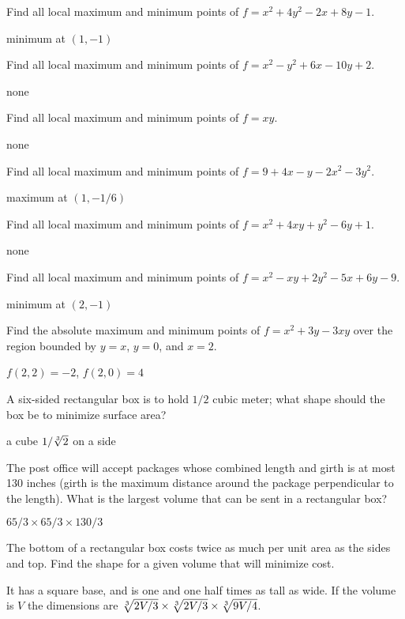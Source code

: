 \begin{exercises}

\exercise Find all local maximum and minimum points of
$f=x^2+4y^2-2x+8y-1$.
\begin{answer} minimum at $(1,-1)$
\end{answer}

\exercise Find all local maximum and minimum points of
$f=x^2-y^2+6x-10y+2$.
\begin{answer} none
\end{answer}

\exercise Find all local maximum and minimum points of
$f=xy$.
\begin{answer} none
\end{answer}

\exercise Find all local maximum and minimum points of
$f=9+4x-y-2x^2-3y^2$.
\begin{answer} maximum at $(1,-1/6)$
\end{answer}

\exercise Find all local maximum and minimum points of
$f=x^2+4xy+y^2-6y+1$.
\begin{answer} none
\end{answer}

\exercise Find all local maximum and minimum points of
$f=x^2-xy+2y^2-5x+6y-9$.
\begin{answer} minimum at $(2,-1)$
\end{answer}

\exercise Find the absolute maximum and minimum points of
$f=x^2+3y-3xy$ over the region bounded by
$y=x$, $y=0$, and $x=2$.
\begin{answer} $f(2,2)=-2$, $f(2,0)=4$
\end{answer}

\exercise A six-sided rectangular box is to hold $1/2$ cubic meter;
what shape should the box be to minimize surface area?
\begin{answer} a cube $1/\root 3 \of {2}$ on a side
\end{answer}

\exercise The post office will accept packages whose combined length
and girth is at most 130 inches (girth is the maximum distance around
the package perpendicular to the length). What is the largest volume
that can be sent in a rectangular box?
\begin{answer} $65/3\times 65/3\times 130/3$
\end{answer}

\exercise The bottom of a rectangular box costs twice as much per unit
area as the sides and top. Find the shape for a given volume that will
minimize cost.
\begin{answer} It has a square base, and is one and one half times as tall as wide.
If the volume is $V$ the dimensions are $\root 3 \of {2V/3}\times
\root 3 \of {2V/3}\times \root 3\of {9V/4}$.
\end{answer}


\end{exercises}

